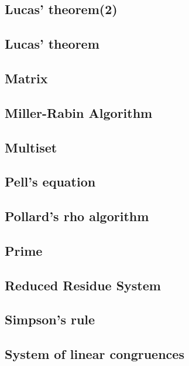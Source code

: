 \documentclass[a4paper,5pt,twocolumn,titlepage]{article}
\begin{document}
\subsection{Lucas' theorem(2)}

\subsection{Lucas' theorem}

\subsection{Matrix}

\subsection{Miller-Rabin Algorithm}

\subsection{Multiset}

\subsection{Pell's equation}

\subsection{Pollard's rho algorithm}

\subsection{Prime}

\subsection{Reduced Residue System}

\subsection{Simpson's rule}

\subsection{System of linear congruences}

\end{document}
